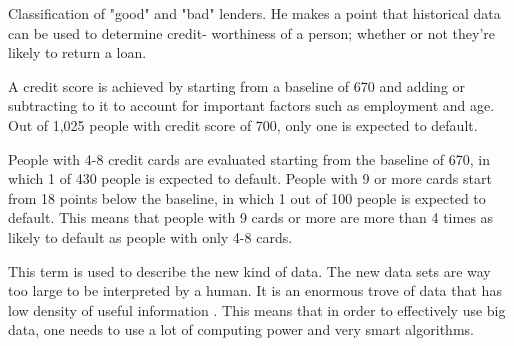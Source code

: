 \documentclass[12pt]{article}
\begin{document}

\begin{enumerate}



Classification of "good" and "bad" lenders. He makes a point that historical data can be used to determine credit- worthiness of a person; whether or not they're likely to return a loan.  


A credit score is achieved by starting from a baseline of 670 and adding or subtracting to it to account for important factors such as employment and age. Out of 1,025 people with credit score of 700, only one is expected to default. 


People with 4-8 credit cards are evaluated starting from the baseline of 670, in which 1 of 430 people is expected to default. People with 9 or more cards start from 18 points below the baseline, in which 1 out of 100 people is expected to default. This means that people with 9 cards or more are more than 4 times as likely to default as people with only 4-8 cards. 


This term is used to describe the new kind of data. The new data sets are way too large to be interpreted by a human. It is an enormous trove of data that has low density of useful information . This means that in order to effectively use big data, one needs to use a lot of computing power and very smart algorithms. 

\end{enumerate}


\end{document}

